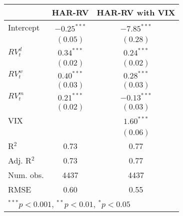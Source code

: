 
\begin{tabular}{l c c }
\hline
 & HAR-RV & HAR-RV with VIX \\
\hline
Intercept    & $-0.25^{***}$ & $-7.85^{***}$ \\
             & $(0.05)$      & $(0.28)$      \\
$RV_{t}^{d}$ & $0.34^{***}$  & $0.24^{***}$  \\
             & $(0.02)$      & $(0.02)$      \\
$RV_{t}^{w}$ & $0.40^{***}$  & $0.28^{***}$  \\
             & $(0.03)$      & $(0.03)$      \\
$RV_{t}^{m}$ & $0.21^{***}$  & $-0.13^{***}$ \\
             & $(0.02)$      & $(0.03)$      \\
VIX          &               & $1.60^{***}$  \\
             &               & $(0.06)$      \\
\hline
R$^2$        & 0.73          & 0.77          \\
Adj. R$^2$   & 0.73          & 0.77          \\
Num. obs.    & 4437          & 4437          \\
RMSE         & 0.60          & 0.55          \\
\hline
\multicolumn{3}{l}{\scriptsize{$^{***}p<0.001$, $^{**}p<0.01$, $^*p<0.05$}}
\end{tabular}
